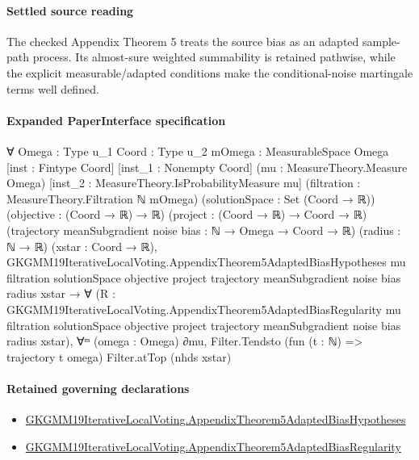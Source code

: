 \documentclass[10pt]{article}
\begin{document}
\paragraph{Settled source reading}
\begin{sloppypar}
The checked Appendix Theorem 5 treats the source bias as an adapted sample-\allowbreak{}path process.\allowbreak{} Its almost-\allowbreak{}sure weighted summability is retained pathwise, while the explicit measurable/\allowbreak{}adapted conditions make the conditional-\allowbreak{}noise martingale terms well defined.\allowbreak{}
\end{sloppypar}

\paragraph{Expanded PaperInterface specification}
\begin{ReviewVerbatim}
∀ {Omega : Type u_1} {Coord : Type u_2} {mOmega : MeasurableSpace Omega} [inst : Fintype Coord]
  [inst_1 : Nonempty Coord] (mu : MeasureTheory.Measure Omega) [inst_2 : MeasureTheory.IsProbabilityMeasure mu]
  (filtration : MeasureTheory.Filtration ℕ mOmega) (solutionSpace : Set (Coord → ℝ)) (objective : (Coord → ℝ) → ℝ)
  (project : (Coord → ℝ) → Coord → ℝ) (trajectory meanSubgradient noise bias : ℕ → Omega → Coord → ℝ) (radius : ℕ → ℝ)
  (xstar : Coord → ℝ),
  GKGMM19IterativeLocalVoting.AppendixTheorem5AdaptedBiasHypotheses mu filtration solutionSpace objective project
      trajectory meanSubgradient noise bias radius xstar →
    ∀
      (R :
        GKGMM19IterativeLocalVoting.AppendixTheorem5AdaptedBiasRegularity mu filtration solutionSpace objective project
          trajectory meanSubgradient noise bias radius xstar),
      ∀ᵐ (omega : Omega) ∂mu, Filter.Tendsto (fun (t : ℕ) => trajectory t omega) Filter.atTop (nhds xstar)
\end{ReviewVerbatim}

\paragraph{Retained governing declarations}
\begin{itemize}\raggedright
\item \hyperlink{governing-declaration-6ad80e26591c9c53}{GKGMM19\allowbreak{}Iterative\allowbreak{}Local\allowbreak{}Voting.\allowbreak{}Appendix\allowbreak{}Theorem5\allowbreak{}Adapted\allowbreak{}Bias\allowbreak{}Hypotheses}
\item \hyperlink{governing-declaration-95e55498d2355ed0}{GKGMM19\allowbreak{}Iterative\allowbreak{}Local\allowbreak{}Voting.\allowbreak{}Appendix\allowbreak{}Theorem5\allowbreak{}Adapted\allowbreak{}Bias\allowbreak{}Regularity}
\end{itemize}
\end{document}
